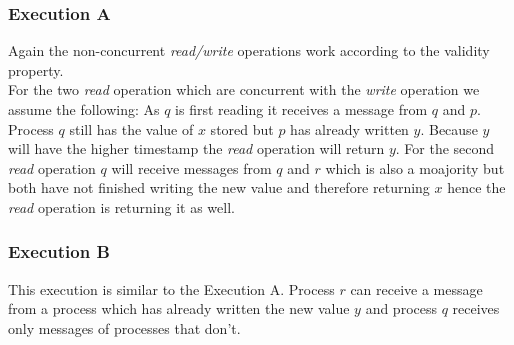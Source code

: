 \documentclass{article}
\begin{document}
\begin{adjustwidth}{2em}{2em}
\begin{adjustwidth}{1em}{2em}
			\subsubsection*{Execution A}
			\begin{adjustwidth}{1em}{}
				Again the non-concurrent \textit{read/write} operations work according to the validity property. \\
				For the two \textit{read} operation which are concurrent with the \textit{write} operation we assume the following: As $q$ is first reading it receives a message from $q$ and $p$. Process $q$ still has the value of $x$ stored but $p$ has already written $y$. Because $y$ will have the higher timestamp the \textit{read} operation will return $y$. For the second \textit{read} operation $q$ will receive messages from $q$ and $r$ which is also a moajority but both have not finished writing the new value and therefore returning $x$ hence the \textit{read} operation is returning it as well.
			\end{adjustwidth}
			\subsubsection*{Execution B}
			\begin{adjustwidth}{1em}{}
				This execution is similar to the Execution A. Process $r$ can receive a message from a process which has already written the new value $y$ and process $q$ receives only messages of processes that don't.
			\end{adjustwidth}
		\end{adjustwidth}
	\end{adjustwidth}
	
\end{document}
